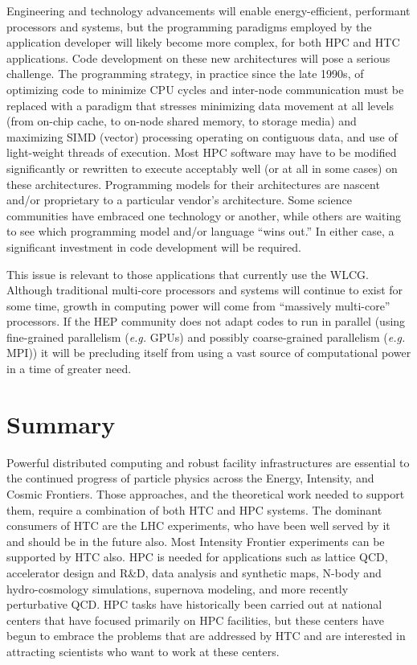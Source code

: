 Engineering and technology advancements will enable energy-efficient, performant processors and systems, but the 
programming paradigms employed by the application developer will likely become more complex, for both HPC and HTC 
applications.   
Code development on these new architectures will pose a serious challenge. 
The programming strategy, in practice since the late 1990s, of optimizing code to minimize CPU cycles and 
inter-node communication must be replaced with a paradigm that stresses minimizing data movement at all levels 
(from on-chip cache, to on-node shared memory, to storage media) and maximizing SIMD (vector) 
processing operating on contiguous data, and use of light-weight threads of execution. 
Most HPC software may have to be modified significantly or rewritten to execute acceptably well 
(or at all in some cases) on these architectures. Programming models for their architectures are 
nascent and/or proprietary to a particular vendor's architecture. Some science communities have 
embraced one technology or another, while others are waiting to see which programming model 
and/or language ``wins out.'' In either case, a significant investment in code development will be required.
 
This issue is relevant to those applications that currently use the WLCG. 
Although traditional multi-core processors and systems will continue to exist for some time, 
growth in computing power will come from ``massively multi-core'' processors. If the HEP community does not adapt codes 
to run in parallel (using fine-grained parallelism ({\it e.g.} GPUs) and possibly 
coarse-grained parallelism ({\it e.g.} MPI)) it will be precluding itself from using a vast source 
of computational power in a time of greater need.
 
\section{Summary}
\label{sec:comp-summary}
Powerful distributed computing and robust facility infrastructures are essential to the continued progress of particle physics across the Energy, Intensity, and Cosmic Frontiers.  Those approaches, and the theoretical work needed to support them, require a combination of both HTC and HPC systems.  The dominant consumers of HTC are the LHC experiments, who have been well served by it and should be in the future also.  Most Intensity Frontier experiments can be supported by HTC also.  HPC is needed for applications such as lattice QCD, accelerator design and R\&D, data analysis and synthetic maps, N-body and hydro-cosmology simulations, supernova modeling, and more recently perturbative QCD.  HPC tasks have historically been carried out at national centers that have focused primarily on HPC facilities, but these centers have begun to embrace the problems that are addressed by HTC and are interested in attracting scientists who want to work at these centers.

